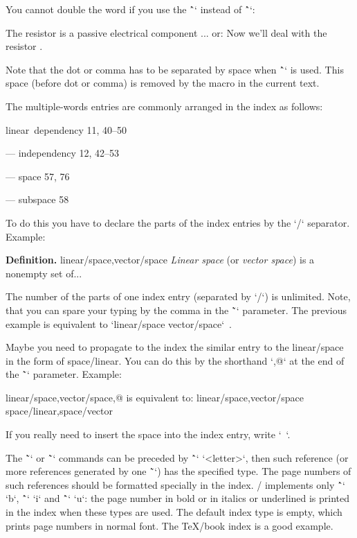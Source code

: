 {You cannot double the word if you use the \^`\iid` instead of \^`\ii`:

\begtt
The \iid resistor is a passive electrical component ...
or:
Now we'll deal with the \iid resistor .
\endtt

Note that the dot or comma has to be separated by space when \^`\iid` is
used. This space (before dot or comma) is removed by the macro in
the current text.

The multiple-words entries are commonly arranged in the index as follows:

\medskip

linear~dependency  11, 40--50

--- independency 12, 42--53

--- space 57, 76

--- subspace 58

\medskip

To do this you have to declare the parts of the index entries by the `/` separator.
Example:

\begtt
{\bf Definition.}
\ii linear/space,vector/space
{\em Linear space} (or {\em vector space}) is a nonempty set of...
\endtt

The number of the parts of one index entry (separated by `/`) is unlimited. Note, that you can
spare your typing by the comma in the \~`\ii` parameter. The previous example
is equivalent to `\ii linear/space \ii vector/space`~.

Maybe you need to propagate to the index the similar entry to the
linear/space in the form of space/linear. You can do this by the shorthand `,@`
at the end of the \~`\ii` parameter. Example:

\begtt
\ii linear/space,vector/space,@
is equivalent to:
\ii linear/space,vector/space \ii space/linear,space/vector
\endtt

If you really need to insert the space into the index entry, write `~`.

The \~`\ii` or \~`\iid` commands can be preceded by \^`\iitype` `<letter>`, then such
reference (or more references generated by one \~`\ii`) has the specified type.
The page numbers of such references should be formatted
specially in the index. \OpTeX/ implements only \^`\iitype` `b`,
\^`\iitype` `i` and \^`\iitype` `u`:
the page number in bold or in italics or underlined is printed
in the index when these types are used. The default index type is empty, which
prints page numbers in normal font. The \TeX/book index is a good example.

}
